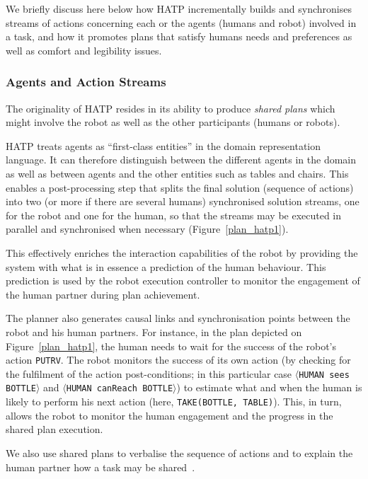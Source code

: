 \documentclass[preprint,3p,times]{elsarticle}
\newcommand{\concept}[1]{{\small \texttt{#1}}}
\newcommand{\stmt}[1]{{\footnotesize\tt$\langle$#1\relax$\rangle$}}
\begin{document}
We briefly discuss here below how HATP incrementally builds and synchronises streams of actions concerning each or the agents (humans and robot) involved in a task, and how it promotes plans that satisfy humans needs and preferences as well as comfort and legibility issues.

\subsubsection{Agents and Action Streams}

The originality of HATP resides in its ability to produce \emph{shared plans} which might involve 
the robot as well as the other participants (humans or robots).

HATP treats agents as ``first-class
entities'' in the domain representation language. It can therefore
distinguish between the different agents in the domain as well as
between agents and the other entities such as tables and chairs. This
enables a post-processing step that splits the final
solution (sequence of actions) into two (or more if there are several
humans) synchronised solution
streams, one for the robot and one for the human, so that the streams may be executed in
parallel and synchronised when necessary (Figure~\ref{plan_hatp1}).

This effectively enriches the interaction capabilities of the robot by providing
the system with what is in essence a prediction of the human behaviour. This
prediction is used by the robot execution controller to monitor the engagement
of the human partner during plan achievement.

The planner also generates causal links and synchronisation points between the robot and his human partners. For
instance, in the plan depicted on Figure~\ref{plan_hatp1}, the human needs to
wait for the success of the robot's action {\tt PUTRV}. The robot monitors the
success of its own action (by checking for the fulfilment of the action
post-conditions; in this particular case \stmt{HUMAN sees BOTTLE} and
\stmt{HUMAN canReach BOTTLE}) to estimate what and when the human is likely to
perform his next action (here, \concept{TAKE(BOTTLE, TABLE)}). This, in turn,
allows the robot to monitor the human engagement and the progress in the shared
plan execution.

We also use shared plans to verbalise the sequence of actions and to explain
the human partner how a task may be shared~\cite{warnier2012when,fiore2016planning,milliez2016using}.
\end{document}
